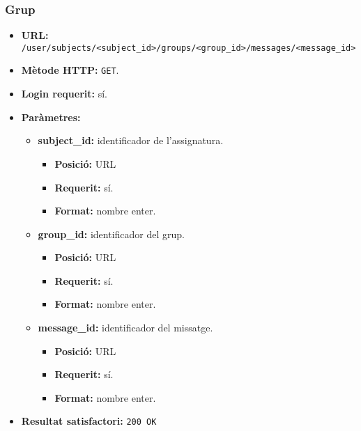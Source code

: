 	\subsubsection{Grup}
	\begin{itemize}
	\item \textbf{\ac{URL}:} \texttt{/user/subjects/<subject\_id>/groups/<group\_id>/messages/<message\_id>}
	\item \textbf{Mètode \ac{HTTP}: } \texttt{GET}.
	\item \textbf{Login requerit:} sí.
	\item \textbf{Paràmetres:}
	\begin{itemize}
		\item \textbf{subject\_id:} identificador de l'assignatura.
		\begin{itemize}
			\item \textbf{Posició:} \ac{URL}
			\item \textbf{Requerit:} sí.
			\item \textbf{Format:} nombre enter.
		\end{itemize}
		\item \textbf{group\_id:} identificador del grup.
		\begin{itemize}
			\item \textbf{Posició:} \ac{URL}
			\item \textbf{Requerit:} sí.
			\item \textbf{Format:} nombre enter.
		\end{itemize}
		\item \textbf{message\_id:} identificador del missatge.
		\begin{itemize}
			\item \textbf{Posició:} \ac{URL}
			\item \textbf{Requerit:} sí.
			\item \textbf{Format:} nombre enter.
		\end{itemize}
	\end{itemize}
	\item \textbf{Resultat satisfactori:} \texttt{200 OK}
	\begin{verbatim}
	

\end{verbatim}
\end{itemize}
